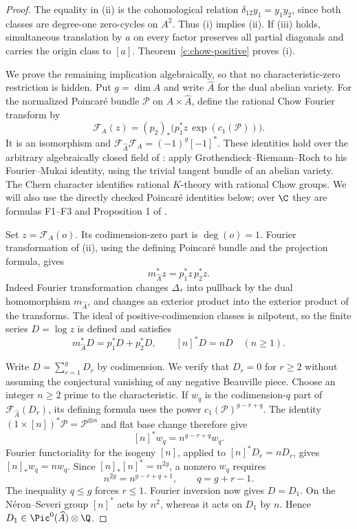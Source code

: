 \begin{proof}
The equality in (ii) is the cohomological relation $\delta_{12}y_1=y_1y_2$, since both classes are degree-one zero-cycles on $A^2$. Thus (i) implies (ii). If (iii) holds, simultaneous translation by $a$ on every factor preserves all partial diagonals and carries the origin class to $[a]$. Theorem~\ref{c:chow-positive} proves (i).

We prove the remaining implication algebraically, so that no characteristic-zero restriction is hidden. Put $g=\dim A$ and write $\widehat A$ for the dual abelian variety. For the normalized Poincar\'e bundle $\mathcal P$ on $A\times\widehat A$, define the rational Chow Fourier transform by
\[
 \mathcal F_A(z)=(p_2)_*\bigl(p_1^*z\,\exp(c_1(\mathcal P))\bigr).
\]
It is an isomorphism and $\mathcal F_{\widehat A}\mathcal F_A=(-1)^g[-1]^*$. These identities hold over the arbitrary algebraically closed field of \citet[Theorem 2.2, p.~156, with the field convention on p.~154]{c_mukai1981}: apply Grothendieck--Riemann--Roch to his Fourier--Mukai identity, using the trivial tangent bundle of an abelian variety. The Chern character identifies rational $K$-theory with rational Chow groups. We will also use the directly checked Poincar\'e identities below; over $\C$ they are formulas F1--F3 and Proposition 1 of \citet[pp.~647--648]{c_beauville1986}.

Set $z=\mathcal F_A(o)$. Its codimension-zero part is $\deg(o)=1$. Fourier transformation of (ii), using the defining Poincar\'e bundle and the projection formula, gives
\[
 m_{\widehat A}^*z=p_1^*z\,p_2^*z.
\]
Indeed Fourier transformation changes $\Delta_*$ into pullback by the dual homomorphism $m_{\widehat A}$, and changes an exterior product into the exterior product of the transforms. The ideal of positive-codimension classes is nilpotent, so the finite series $D=\log z$ is defined and satisfies
\[
 m_{\widehat A}^*D=p_1^*D+p_2^*D,
 \qquad [n]^*D=nD\quad(n\geq1).
\]

Write $D=\sum_{r=1}^gD_r$ by codimension. We verify that $D_r=0$ for $r\geq2$ without assuming the conjectural vanishing of any negative Beauville piece. Choose an integer $n\geq2$ prime to the characteristic. If $w_q$ is the codimension-$q$ part of $\mathcal F_{\widehat A}(D_r)$, its defining formula uses the power $c_1(\mathcal P)^{g-r+q}$. The identity $(1\times[n])^*\mathcal P=\mathcal P^{\otimes n}$ and flat base change therefore give
\[
 [n]^*w_q=n^{g-r+q}w_q.
\]
Fourier functoriality for the isogeny $[n]$, applied to $[n]^*D_r=nD_r$, gives $[n]_*w_q=nw_q$. Since $[n]_*[n]^*=n^{2g}$, a nonzero $w_q$ requires
\[
 n^{2g}=n^{g-r+q+1},\qquad q=g+r-1.
\]
The inequality $q\leq g$ forces $r\leq1$. Fourier inversion now gives $D=D_1$. On the N\'eron--Severi group $[n]^*$ acts by $n^2$, whereas it acts on $D_1$ by $n$. Hence $D_1\in\Pic^0(\widehat A)\otimes\Q$.


\end{proof}
